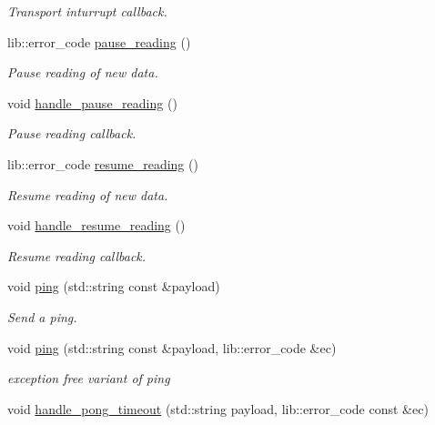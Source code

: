 \begin{DoxyCompactItemize}
\begin{DoxyCompactList}\small\item\em Transport inturrupt callback. \end{DoxyCompactList}\item 
lib\+::error\+\_\+code \hyperlink{classwebsocketpp_1_1connection_ad6a4a25a18ec61d2a36a149a3d92ab72}{pause\+\_\+reading} ()
\begin{DoxyCompactList}\small\item\em Pause reading of new data. \end{DoxyCompactList}\item 
void \hyperlink{classwebsocketpp_1_1connection_a5887284ea346efd7b5cc43519bfd84d5}{handle\+\_\+pause\+\_\+reading} ()
\begin{DoxyCompactList}\small\item\em Pause reading callback. \end{DoxyCompactList}\item 
lib\+::error\+\_\+code \hyperlink{classwebsocketpp_1_1connection_a355b5e155ba53071b06fa8a6dfab9be2}{resume\+\_\+reading} ()
\begin{DoxyCompactList}\small\item\em Resume reading of new data. \end{DoxyCompactList}\item 
void \hyperlink{classwebsocketpp_1_1connection_adb5b479b7d66eb289390b26d12332d84}{handle\+\_\+resume\+\_\+reading} ()
\begin{DoxyCompactList}\small\item\em Resume reading callback. \end{DoxyCompactList}\item 
void \hyperlink{classwebsocketpp_1_1connection_a21c8dc6badfaff3aaee1434625c09b04}{ping} (std\+::string const \&payload)
\begin{DoxyCompactList}\small\item\em Send a ping. \end{DoxyCompactList}\item 
void \hyperlink{classwebsocketpp_1_1connection_a6766e2f31adc6843a983551b21683b73}{ping} (std\+::string const \&payload, lib\+::error\+\_\+code \&ec)\hypertarget{classwebsocketpp_1_1connection_a6766e2f31adc6843a983551b21683b73}{}\label{classwebsocketpp_1_1connection_a6766e2f31adc6843a983551b21683b73}

\begin{DoxyCompactList}\small\item\em exception free variant of ping \end{DoxyCompactList}\item 
void \hyperlink{classwebsocketpp_1_1connection_af10cbbbfe16ef1cc6f45614582c9d28f}{handle\+\_\+pong\+\_\+timeout} (std\+::string payload, lib\+::error\+\_\+code const \&ec)\hypertarget{classwebsocketpp_1_1connection_af10cbbbfe16ef1cc6f45614582c9d28f}{}\label{classwebsocketpp_1_1connection_af10cbbbfe16ef1cc6f45614582c9d28f}


\end{DoxyCompactItemize}
